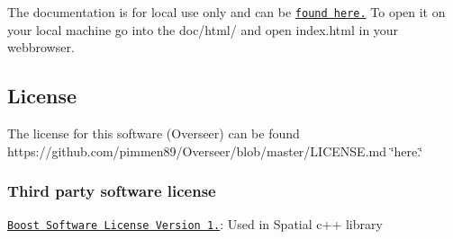 The documentation is for local use only and can be \href{https://mejan.github.io}{\tt found here.} To open it on your local machine go into the doc/html/ and open index.\+html in your webbrowser.

\subsection*{License}

The license for this software (Overseer) can be found https\+://github.com/pimmen89/\+Overseer/blob/master/\+L\+I\+C\+E\+N\+S\+E.\+md \char`\"{}here.\char`\"{}

\subsubsection*{Third party software license}


\begin{DoxyItemize}
\item \href{http://www.boost.org/LICENSE_1_0.txt}{\tt Boost Software License Version 1.}\+: Used in Spatial c++ library 
\end{DoxyItemize}